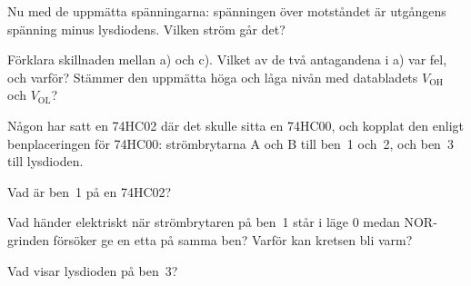 Nu med de uppmätta spänningarna: spänningen över motståndet är utgångens spänning minus
lysdiodens. Vilken ström går det?

Förklara skillnaden mellan a) och c). Vilket av de två antagandena i a) var fel, och varför?
Stämmer den uppmätta höga och låga nivån med databladets $V_{\text{OH}}$ och $V_{\text{OL}}$?

\label{c5:ex:11}
Någon har satt en 74HC02 där det skulle sitta en 74HC00, och kopplat den enligt benplaceringen för
74HC00: strömbrytarna A och B till ben~1 och~2, och ben~3 till lysdioden.
\begin{parts}
  \item Vad är ben~1 på en 74HC02?
  \item Vad händer elektriskt när strömbrytaren på ben~1 står i läge 0 medan NOR-grinden försöker
    ge en etta på samma ben? Varför kan kretsen bli varm?
  \item Vad visar lysdioden på ben~3?
\end{parts}
